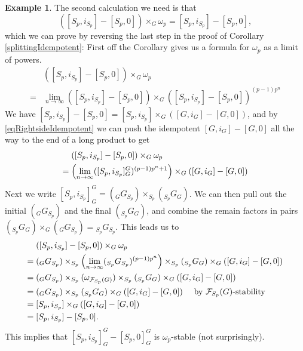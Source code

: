 \documentclass[10pt]{amsart}
\theoremstyle{definition}
\newtheorem{example}[theorem]{Example}
\begin{document}
\begin{example}
The second calculation we need is that
\[([S_p,i_{S_p}] - [S_p,0] ) \times_G \omega_p = [S_p,i_{S_p}] - [S_p,0],\]
which we can prove by reversing the last step in the proof of Corollary \ref{splittingIdempotent}: First off the Corollary gives us a formula for $\omega_p$ as a limit of powers.
\begin{align*}
&([S_p,i_{S_p}] - [S_p,0] ) \times_G \omega_p
\\ ={}& \lim_{n \to \infty} ( [S_p, i_{S_p}] - [S_p,0] ) \times_G ( [S_p, i_{S_p}] - [S_p,0] )^{ (p-1)p^n }
\end{align*}
We have $[S_p,i_{S_p}]-[S_p,0] = [S_p,i_{S_p}]\times_G ([G,i_G]-[G,0])$, and by \eqref{eqRightsideIdempotent} we can push the idempotent $[G,i_G]-[G,0]$ all the way to the end of a long product to get
\begin{align*}
&([S_p,i_{S_p}] - [S_p,0] ) \times_G \omega_p
\\ ={}& \Bigl(\lim_{n \to \infty} ( [S_p, i_{S_p}]_G^G )^{ (p-1)p^n+1 } \Bigr) \times_G ([G,i_G]-[G,0])
\end{align*}
Next we write $[S_p, i_{S_p}]_G^G = ({}_G G_{S_p})\times_{S_p} ({}_{S_p} G_G)$. We can then pull out the initial $({}_G G_{S_p})$ and the final $({}_{S_p} G_G)$, and combine the remain factors in pairs $({}_{S_p} G_G) \times_G ({}_G G_{S_p}) = {}_{S_p} G_{S_p}$. This leads us to
\begin{align*}
&([S_p,i_{S_p}] - [S_p,0] ) \times_G \omega_p
\\ ={}& ({}_G G_{S_p})\times_{S_p}\Bigl(\lim_{n \to \infty} ( {}_{S_p}G_{S_p} )^{ (p-1)p^n } \Bigr)\times_{S_p} ({}_{S_p} G_G) \times_G ([G,i_G]-[G,0])
\\ ={}& ({}_G G_{S_p}) \times_{S_p} (\omega_{\mathcal{F}_{S_p}(G)}) \times_{S_p} ({}_{S_p} G_G) \times_G ([G,i_G]-[G,0])
\\ ={}& ({}_G G_{S_p}) \times_{S_p} ({}_{S_p} G_G) \times_G ([G,i_G]-[G,0])             \quad\text{ by $\mathcal{F}_{S_p}(G)$-stability}
\\ ={}& [S_p,i_{S_p}]\times_G ([G,i_G]-[G,0])
\\ ={}& [S_p, i_{S_p}] - [S_p,0].
\end{align*}
This implies that $[S_p, i_{S_p}]_G^G - [S_p,0]_G^G$ is $\omega_p$-stable (not surprisingly).


\end{example}
\end{document}
